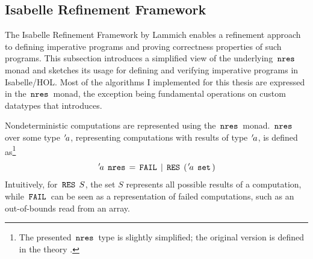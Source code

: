 \subsection{Isabelle Refinement Framework}\label{sec:isabelle-refinement-framework}
The Isabelle Refinement Framework by Lammich \cite{isabelle-refinement-framework} enables a refinement approach to defining imperative programs and proving correctness properties of such programs.
This subsection introduces a simplified view of the underlying $\,\text{\ttfamily nres}\,$ monad and sketches its usage for defining and verifying imperative programs in Isabelle/HOL.
Most of the algorithms I implemented for this thesis are expressed in the $\,\text{\ttfamily nres}\,$ monad, the exception being fundamental operations on custom datatypes that  introduces.

Nondeterministic computations are represented using the $\,\text{\ttfamily nres}\,$ monad.
$\,\text{\ttfamily nres}\,$ over some type ${\mskip2mu '\mskip-2mua}$, representing computations with results of type ${\mskip2mu '\mskip-2mua}$, is defined as\footnote{The presented $\,\text{\ttfamily nres}\,$ type is slightly simplified; the original version is defined in the theory .}
$$
	{\mskip2mu '\mskip-2mua} \; \,\text{\ttfamily nres}\, = \,\text{\ttfamily FAIL}\, \mid \,\text{\ttfamily RES}\, \; ({\mskip2mu '\mskip-2mua} \; \,\text{\ttfamily set}\,)
$$
Intuitively, for $\,\text{\ttfamily RES}\, \; S$, the set $S$ represents all possible results of a computation, while $\,\text{\ttfamily FAIL}\,$ can be seen as a representation of failed computations, such as an out-of-bounds read from an array.

